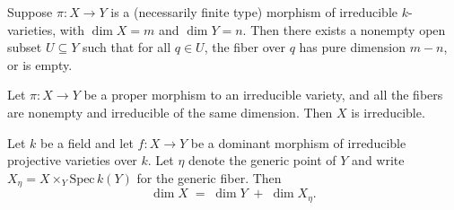 

\begin{theorem}
    Suppose $\pi \colon X \to Y$ is a (necessarily finite type) morphism of irreducible $k$-varieties, with $\dim X = m$ and $\dim Y = n$. Then there exists a nonempty open subset $U \subseteq Y$ such that for all $q \in U$, the fiber over $q$ has pure dimension $m-n$, or is empty.
\end{theorem}

\begin{lemma}\label{lem:irred_fiber}
    Let $\pi \colon X \to Y$ be a proper morphism to an irreducible variety, and all the fibers are nonempty and irreducible of the same dimension. Then $X$ is irreducible.
\end{lemma}

\begin{theorem} \label{thm:fiber}
    Let $k$ be a field and let $f\colon X \to Y$ be a dominant morphism of irreducible projective varieties over $k$. Let $\eta$ denote the generic point of $Y$ and write $X_\eta = X \times_Y \mathrm{Spec}\,k(Y)$ for the generic fiber. Then
    \[
        \dim X \;=\; \dim Y \;+\; \dim X_\eta.
    \]
\end{theorem}
